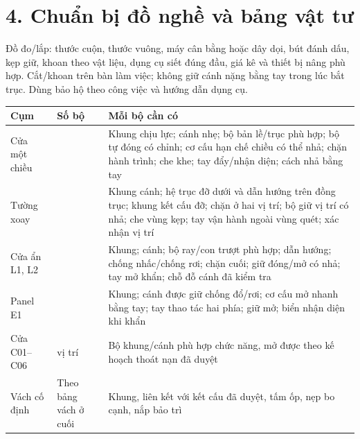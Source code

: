 \documentclass[
  11pt,
  a4paper,
]{article}
\newcounter{none} %
\begin{document}
\section{4. Chuẩn bị đồ nghề và bảng vật
tư}\label{chuux1ea9n-bux1ecb-ux111ux1ed3-nghux1ec1-vuxe0-bux1ea3ng-vux1eadt-tux1b0}

Đồ đo/lắp: thước cuộn, thước vuông, máy cân bằng hoặc dây dọi, bút đánh
dấu, kẹp giữ, khoan theo vật liệu, dụng cụ siết đúng đầu, giá kê và
thiết bị nâng phù hợp. Cắt/khoan trên bàn làm việc; không giữ cánh nặng
bằng tay trong lúc bắt trục. Dùng bảo hộ theo công việc và hướng dẫn
dụng cụ.

{\def\LTcaptype{none} %
\begin{longtable}[]{@{}
  >{\raggedright\arraybackslash}p{}
  >{\raggedright\arraybackslash}p{}
  >{\raggedright\arraybackslash}p{}@{}}
\toprule\noalign{}
\begin{minipage}[b]{\linewidth}\raggedright
Cụm
\end{minipage} & \begin{minipage}[b]{\linewidth}\raggedright
Số bộ
\end{minipage} & \begin{minipage}[b]{\linewidth}\raggedright
Mỗi bộ cần có
\end{minipage} \\
\midrule\noalign{}
\endhead
\bottomrule\noalign{}
\endlastfoot
Cửa một chiều & 22 & Khung chịu lực; cánh nhẹ; bộ bản lề/trục phù hợp;
bộ tự đóng có chỉnh; cơ cấu hạn chế chiều có thể nhả; chặn hành trình;
che khe; tay đẩy/nhận diện; cách nhả bằng tay \\
Tường xoay & 4 & Khung cánh; hệ trục đỡ dưới và dẫn hướng trên đồng
trục; khung kết cấu đỡ; chặn ở hai vị trí; bộ giữ vị trí có nhả; che
vùng kẹp; tay vận hành ngoài vùng quét; xác nhận vị trí \\
Cửa ẩn L1, L2 & 2 & Khung; cánh; bộ ray/con trượt phù hợp; dẫn hướng;
chống nhấc/chống rơi; chặn cuối; giữ đóng/mở có nhả; tay mở khẩn; chỗ đỗ
cánh đã kiểm tra \\
Panel E1 & 1 & Khung; cánh được giữ chống đổ/rơi; cơ cấu mở nhanh bằng
tay; tay thao tác hai phía; giữ mở; biển nhận diện khi khẩn \\
Cửa C01--C06 & 6 vị trí & Bộ khung/cánh phù hợp chức năng, mở được theo
kế hoạch thoát nạn đã duyệt \\
Vách cố định & Theo bảng vách ở cuối & Khung, liên kết với kết cấu đã
duyệt, tấm ốp, nẹp bo cạnh, nắp bảo trì \\
\end{longtable}
}
\end{document}

